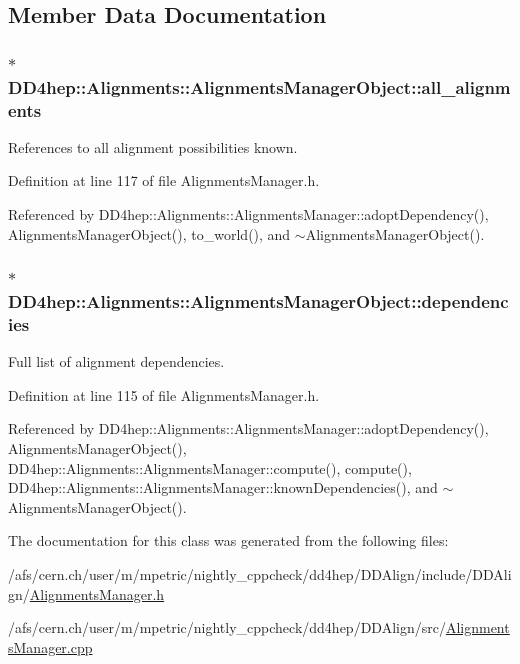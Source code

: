 \subsection{Member Data Documentation}
\hypertarget{class_d_d4hep_1_1_alignments_1_1_alignments_manager_object_ace0f6d572f7c1432436db1aab7a82dca}{
\subsubsection[{all\_\-alignments}]{$\ast$ {\bf DD4hep::Alignments::AlignmentsManagerObject::all\_\-alignments}}}
\label{class_d_d4hep_1_1_alignments_1_1_alignments_manager_object_ace0f6d572f7c1432436db1aab7a82dca}


References to all alignment possibilities known. 

Definition at line 117 of file AlignmentsManager.h.

Referenced by DD4hep::Alignments::AlignmentsManager::adoptDependency(), AlignmentsManagerObject(), to\_\-world(), and $\sim$AlignmentsManagerObject().\hypertarget{class_d_d4hep_1_1_alignments_1_1_alignments_manager_object_ad936882d8b5fcccecb4a13821539413e}{
\subsubsection[{dependencies}]{$\ast$ {\bf DD4hep::Alignments::AlignmentsManagerObject::dependencies}}}
\label{class_d_d4hep_1_1_alignments_1_1_alignments_manager_object_ad936882d8b5fcccecb4a13821539413e}


Full list of alignment dependencies. 

Definition at line 115 of file AlignmentsManager.h.

Referenced by DD4hep::Alignments::AlignmentsManager::adoptDependency(), AlignmentsManagerObject(), DD4hep::Alignments::AlignmentsManager::compute(), compute(), DD4hep::Alignments::AlignmentsManager::knownDependencies(), and $\sim$AlignmentsManagerObject().

The documentation for this class was generated from the following files:\begin{DoxyCompactItemize}
\item 
/afs/cern.ch/user/m/mpetric/nightly\_\-cppcheck/dd4hep/DDAlign/include/DDAlign/\hyperlink{_alignments_manager_8h}{AlignmentsManager.h}\item 
/afs/cern.ch/user/m/mpetric/nightly\_\-cppcheck/dd4hep/DDAlign/src/\hyperlink{_alignments_manager_8cpp}{AlignmentsManager.cpp}\end{DoxyCompactItemize}
